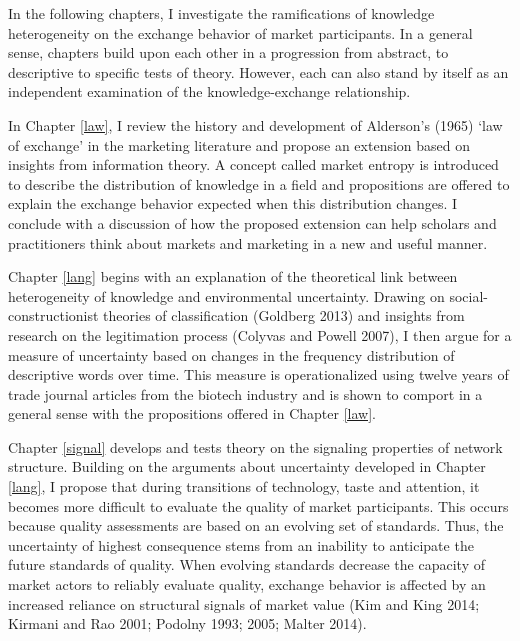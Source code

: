 In the following chapters, I investigate the ramifications of knowledge heterogeneity on the exchange behavior of market participants. In a general sense, chapters build upon each other in a progression from abstract, to descriptive to specific tests of theory. However, each can also stand by itself as an independent examination of the knowledge-exchange relationship. 

In Chapter \ref{law}, I review the history and development of Alderson's (1965) `law of exchange' in the marketing literature and propose an extension based on insights from information theory. A concept called market entropy is introduced to describe the distribution of knowledge in a field and propositions are offered to explain the exchange behavior expected when this distribution changes. I conclude with a discussion of how the proposed extension can help scholars and practitioners think about markets and marketing in a new and useful manner. 

Chapter \ref{lang} begins with an explanation of the theoretical link between heterogeneity of knowledge and environmental uncertainty. Drawing on social-constructionist theories of classification (Goldberg 2013) and insights from research on the legitimation process (Colyvas and Powell 2007), I then argue for a measure of uncertainty based on changes in the frequency distribution of descriptive words over time. This measure is operationalized using twelve years of trade journal articles from the biotech industry and is shown to comport in a general sense with the propositions offered in Chapter \ref{law}. 

Chapter \ref{signal} develops and tests theory on the signaling properties of network structure. Building on the arguments about uncertainty developed in Chapter \ref{lang}, I propose that during transitions of technology, taste and attention, it becomes more difficult to evaluate the quality of market participants. This occurs because quality assessments are based on an evolving set of standards. Thus, the uncertainty of highest consequence stems from an inability to anticipate the future standards of quality. When evolving standards decrease the capacity of market actors to reliably evaluate quality, exchange behavior is affected by an increased reliance on structural signals of market value (Kim and King 2014; Kirmani and Rao 2001; Podolny 1993; 2005; Malter 2014). 

